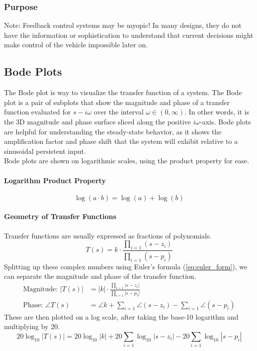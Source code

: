 \documentclass[../notes.tex]{subfiles}
\begin{document}
\subsubsection{Purpose}
\begin{emphasis} \label{sec:feedbackMyopia}
   $\boxed{\text{Note:}}$ Feedback control systems may be myopic! In many designs, they do not have the information or sophistication to understand that current decisions might make control of the vehicle impossible later on.
\end{emphasis}

\subsection{Bode Plots}
The Bode plot is way to visualize the transfer function of a system. The Bode plot is a pair of subplots that show the magnitude and phase of a transfer function evaluated for $s-i\omega$ over the interval $\omega \in (0, \infty)$. In other words, it is the 3D magnitude and phase surface sliced along the positive $i\omega$-axis. Bode plots are helpful for understanding the steady-state behavior, as it shows the amplification factor and phase shift that the system will exhibit relative to a sinusoidal persistent input.\\ 
Bode plots are shown on logarithmic scales, using the product property for ease.
\paragraph{Logarithm Product Property}
\begin{equation*}
    \log(a\cdot b) = \log(a) + \log(b)
\end{equation*}

\paragraph{Geometry of Transfer Functions}
Transfer functions  are usually expressed as fractions of polynomials.
\begin{equation*}
    T(s) = k \cdot \frac{\prod_{i=1}(s-z_i)}{\prod_{i=1}(s-p_i)}
\end{equation*}
Splitting up these complex numbers using Euler's formula (\underline{\ref{eq:euler_form}}), we can separate the magnitude and phase of the transfer function.
\begin{align*}
    \text{Magnitude: } |T(s)| &= |k| \cdot \frac{\prod_{i=1}|s-z_i|}{\prod_{i=1}|s-p_i|} \\
    \text{Phase: } \angle T(s) &= \angle k + \sum_{i=1} \angle(s-z_i) - \sum_{i=1} \angle(s-p_i)
\end{align*}
These are then plotted on a log scale, after taking the base-10 logarithm and multiplying by 20.
\begin{equation*}
    20\log_{10}|T(s)| = 20\log_{10}|k| + 20\sum_{i=1}\log_{10}|s-z_i| - 20\sum_{i=1}\log_{10}|s-p_i|
\end{equation*}
\end{document}
